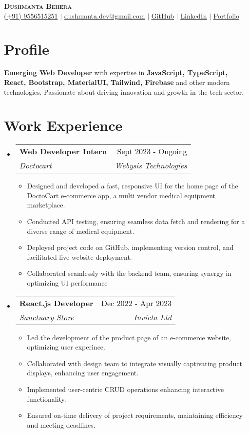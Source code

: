 \documentclass[letterpaper,11pt]{article}
\makeatletter
\newcommand{\resumeItem}[1]{
  \item\small{
    {#1 \vspace{-2pt}}
  }
}
\newcommand{\resumeSubheading}[4]{
  \vspace{-2pt}\item
    \begin{tabular*}{0.97\textwidth}[t]{l@{\extracolsep{\fill}}r}
      \textbf{#1} & #2 \\
      \textit{\small#3} & \textit{\small #4} \\
    \end{tabular*}\vspace{-7pt}
}
\newcommand{\resumeSubHeadingListStart}{\begin{itemize}[leftmargin=0.15in, label={}]}
\newcommand{\resumeSubHeadingListEnd}{\end{itemize}}
\newcommand{\resumeItemListStart}{\begin{itemize}}
\newcommand{\resumeItemListEnd}{\end{itemize}\vspace{-5pt}}
\makeatother
\begin{document}

\begin{center}
   \textbf{\Huge \scshape Dushmanta Behera} \\ \vspace{1pt}
    \small 
    \raisebox{-0.05\height}{\faPhone*} \href{tel:+919556515251}{{(+91) 9556515251}} $|$ 
    \raisebox{-0.05\height}{\faEnvelope} \href{mailto:dushmanta0511@gmail.com}{{dushmanta.dev@gmail.com}} $|$ 
    \raisebox{-0.05\height}{\faGithub} \href{https://github.com/dushmanta05}{{\underline{GitHub}}}
     $|$ 
    \raisebox{-0.05\height}{\faLinkedin} \href{https://www.linkedin.com/in/dushmanta05/}{{\underline{LinkedIn}}}
    $|$ 
    \raisebox{-0.05\height}{\faGlobe} \href{https://dushmanta.is-a.dev/}{{\underline{Portfolio}}}
    
    
\end{center}

\section{Profile}
    
\textbf{Emerging Web Developer} with expertise in \textbf{JavaScript, TypeScript, React, Bootstrap, MaterialUI, Tailwind, Firebase} and other modern technologies. Passionate about driving innovation and growth in the tech sector.

\section{Work Experience}
  \resumeSubHeadingListStart
  \resumeSubheading
      {Web Developer Intern}{Sept 2023 - Ongoing}
      {{Doctocart}}{Webysis Technologies}
      \resumeItemListStart
       \resumeItem{Designed and developed a fast, responsive UI for the home page of the DoctoCart e-commerce app, a multi vendor medical equipment marketplace.}
        \resumeItem{Conducted API testing, ensuring seamless data fetch and rendering for a diverse range of medical equipment.}
         \resumeItem{Deployed project code on GitHub, implementing version control, and facilitated live website deployment.}
         \resumeItem{Collaborated seamlessly with the backend team, ensuring synergy in optimizing UI performance}
    \resumeItemListEnd
  \resumeSubheading
      {React.js Developer}{Dec 2022 - Apr 2023}
      {\href{https://sanctuarystore.co.nz/} {Sanctuary Store}}{Invicta Ltd}
      \resumeItemListStart
       \resumeItem{Led the development of the product page of an e-commerce website, optimizing user experince.}
        \resumeItem{Collaborated with design team to integrate visually captivating product displays, enhancing user engagement.}
         \resumeItem{Implemented user-centric CRUD operations enhancing interactive functionality.}
         \resumeItem{Ensured on-time delivery of project requirements, maintaining efficiency and meeting deadlines.}
    \resumeItemListEnd
  \resumeSubHeadingListEnd
\end{document}
